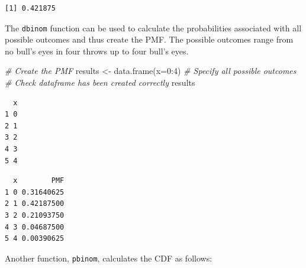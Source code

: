 \documentclass[
  oneside]{krantz}
\newenvironment{Shaded}{\begin{snugshade}}{\end{snugshade}}
\newcommand{\AttributeTok}[1]{\textcolor[rgb]{0.77,0.63,0.00}{#1}}
\newcommand{\CommentTok}[1]{\textcolor[rgb]{0.56,0.35,0.01}{\textit{#1}}}
\newcommand{\DecValTok}[1]{\textcolor[rgb]{0.00,0.00,0.81}{#1}}
\newcommand{\FunctionTok}[1]{\textcolor[rgb]{0.00,0.00,0.00}{#1}}
\newcommand{\NormalTok}[1]{#1}
\newcommand{\OtherTok}[1]{\textcolor[rgb]{0.56,0.35,0.01}{#1}}
\newcommand{\SpecialCharTok}[1]{\textcolor[rgb]{0.00,0.00,0.00}{#1}}
\begin{document}
\begin{verbatim}
[1] 0.421875
\end{verbatim}

The \texttt{dbinom} function can be used to calculate the probabilities associated with all possible outcomes and thus create the PMF. The possible outcomes range from no bull's eyes in four throws up to four bull's eyes.

\begin{Shaded}
\begin{Highlighting}[]
\CommentTok{\# Create the PMF }
\NormalTok{results }\OtherTok{\textless{}{-}} \FunctionTok{data.frame}\NormalTok{(}\AttributeTok{x=}\DecValTok{0}\SpecialCharTok{:}\DecValTok{4}\NormalTok{) }\CommentTok{\# Specify all possible outcomes}
\CommentTok{\# Check dataframe has been created correctly}
\NormalTok{results}
\end{Highlighting}
\end{Shaded}

\begin{verbatim}
  x
1 0
2 1
3 2
4 3
5 4
\end{verbatim}

\begin{Shaded}
\end{Shaded}

\begin{verbatim}
  x        PMF
1 0 0.31640625
2 1 0.42187500
3 2 0.21093750
4 3 0.04687500
5 4 0.00390625
\end{verbatim}

Another function, \texttt{pbinom}, calculates the CDF as follows:

\begin{Shaded}
\end{Shaded}
\end{document}
